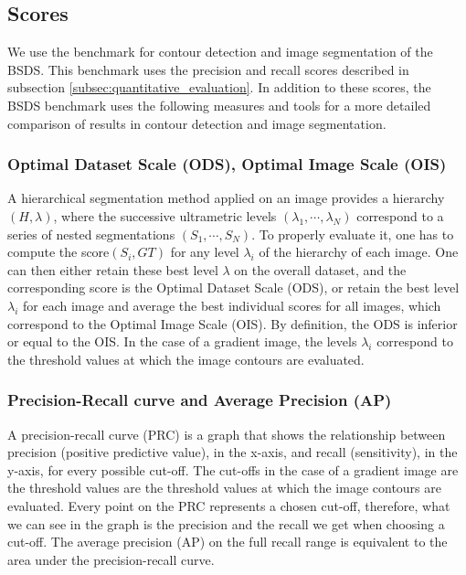 \subsection{Scores}
We use the benchmark for contour detection and image segmentation of the BSDS. This benchmark uses the precision and recall scores described in subsection \ref{subsec:quantitative_evaluation}. In addition to these scores, the BSDS benchmark uses the following measures and tools for a more detailed comparison of results in contour detection and image segmentation.


\subsubsection{Optimal Dataset Scale (ODS), Optimal Image Scale (OIS)}

A hierarchical segmentation method applied on an image provides a hierarchy $(H, \lambda)$, where the successive ultrametric levels $(\lambda_1, \cdots , \lambda_N )$ correspond to a series of nested segmentations $(S_1, \cdots , S_N )$. To properly evaluate it, one has to compute the score$(S_i , GT )$ for any level $\lambda_i$ of the hierarchy of each image. One can then either retain these best level $\lambda$ on the overall dataset, and the corresponding score is the Optimal Dataset Scale (ODS), or retain the best level $\lambda_i$ for each image and average the best individual scores for all images, which correspond to the Optimal Image Scale (OIS). By definition, the ODS is inferior or equal to the OIS. In the case of a gradient image, the levels $\lambda_i$ correspond to the threshold values at which the image contours are evaluated.

\subsubsection{Precision-Recall curve and Average Precision (AP)}

A precision-recall curve (PRC) is a graph that shows the relationship between precision (positive predictive value), in the x-axis, and recall (sensitivity), in the y-axis, for every possible cut-off. The cut-offs in the case of a gradient image are the threshold values are the threshold values at which the image contours are evaluated. Every point on the PRC represents a chosen cut-off, therefore, what we can see in the graph is the precision and the recall we get when choosing a cut-off. The average precision (AP) on the full recall range is equivalent to the area under the precision-recall curve.

